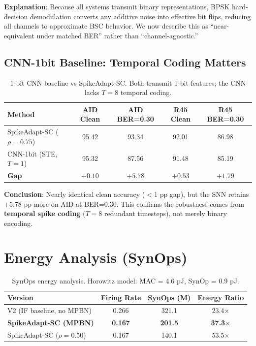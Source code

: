 \documentclass[11pt]{article}
\begin{document}
\textbf{Explanation}: Because all systems transmit binary representations, BPSK hard-decision demodulation converts any additive noise into effective bit flips, reducing all channels to approximate BSC behavior. We now describe this as ``near-equivalent under matched BER'' rather than ``channel-agnostic.''

\subsection{CNN-1bit Baseline: Temporal Coding Matters}

\begin{table}[H]
\centering
\caption{1-bit CNN baseline vs SpikeAdapt-SC. Both transmit 1-bit features; the CNN lacks $T{=}8$ temporal coding.}
\begin{tabular}{l cccc}
\toprule
\textbf{Method} & \textbf{AID Clean} & \textbf{AID BER=0.30} & \textbf{R45 Clean} & \textbf{R45 BER=0.30} \\
\midrule
SpikeAdapt-SC ($\rho{=}0.75$) & 95.42 & 93.34 & 92.01 & 86.98 \\
CNN-1bit (STE, $T{=}1$) & 95.32 & 87.56 & 91.48 & 85.19 \\
\midrule
\textbf{Gap} & $+0.10$ & $\boldsymbol{+5.78}$ & $+0.53$ & $\boldsymbol{+1.79}$ \\
\bottomrule
\end{tabular}
\end{table}

\textbf{Conclusion}: Nearly identical clean accuracy ($<$1 pp gap), but the SNN retains +5.78 pp more on AID at BER=0.30. This confirms the robustness comes from \textbf{temporal spike coding} ($T{=}8$ redundant timesteps), not merely binary encoding.

\section{Energy Analysis (SynOps)}

\begin{table}[H]
\centering
\caption{SynOps energy analysis. Horowitz model: MAC = 4.6 pJ, SynOp = 0.9 pJ.}
\begin{tabular}{l ccc}
\toprule
\textbf{Version} & \textbf{Firing Rate} & \textbf{SynOps (M)} & \textbf{Energy Ratio} \\
\midrule
V2 (IF baseline, no MPBN) & 0.266 & 321.1 & 23.4$\times$ \\
\textbf{SpikeAdapt-SC (MPBN)} & \textbf{0.167} & \textbf{201.5} & \textbf{37.3$\times$} \\
SpikeAdapt-SC ($\rho{=}0.50$) & 0.167 & 140.1 & 53.5$\times$ \\
\bottomrule
\end{tabular}
\end{table}
\end{document}
